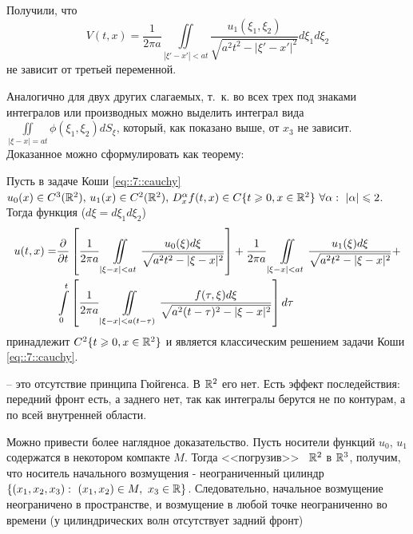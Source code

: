 \documentclass[../main.tex]{subfiles}
\begin{document}
Получили, что 
\[
V(t, x)=\frac{1}{2\pi a}\iint\limits_{|\xi' -x'|<at}\frac{u_1(\xi_1, \xi_2)}{\sqrt{a^2t^2-|\xi' -x'|^2}}d\xi_1d\xi_2
\]
не зависит от третьей переменной. 

Аналогично для двух других слагаемых, т.~к. во всех трех под знаками интегралов или производных можно выделить интеграл вида $\displaystyle\iint\limits_{|\xi -x|=at}\phi (\xi_1, \xi_2)dS_{\xi}$, который, как показано выше, от $x_3$ не зависит. Доказанное можно сформулировать как теорему:
\begin{theorem}
Пусть в задаче Коши \eqref{eq::7::cauchy} $u_0(x)\in C^3(\mathbb{R}^2),\, u_1(x)\in C^2(\mathbb{R}^2),\, D_x^{\alpha}f(t,x)\in C\{t\geqslant 0, x\in\mathbb{R}^2\}\ \forall\alpha :\ |\alpha |\leqslant 2$. Тогда функция ($d\xi =d\xi_1d\xi_2$)
\[
\begin{split}
u(t, x)=&\frac{\partial }{\partial t}\left[\frac{1}{2\pi a}\iint\limits_{|\xi - x|<at}\frac{u_0(\xi )d\xi}{\sqrt{a^2t^2-|\xi - x|^2}} \right]+ \frac{1}{2\pi a}\iint\limits_{|\xi - x|<at}\frac{u_1(\xi )d\xi}{\sqrt{a^2t^2-|\xi - x|^2}}+\\
&\int\limits_0^t\left[\frac{1}{2\pi a}\iint\limits_{|\xi - x|<a(t-\tau )}\frac{f(\tau ,\xi )d\xi}{\sqrt{a^2(t-\tau )^2-|\xi - x|^2}} \right]d\tau
\end{split}
\]
принадлежит $C^2\{t\geqslant 0, x\in\mathbb{R}^2 \}$ и является классическим решением задачи Коши \eqref{eq::7::cauchy}.
\end{theorem}
\begin{definition}
-- это отсутствие принципа Гюйгенса. В $\mathbb{R}^2$ его нет. Есть эффект последействия: передний фронт есть, а заднего нет, так как интегралы берутся не по контурам, а по всей внутренней области.
\end{definition}
Можно привести более наглядное доказательство. Пусть носители функций $u_0$, $u_1$ содержатся в некотором компакте $M$. Тогда <<погрузив>>~ $\mathbb{R}^2$ в $\mathbb{R}^3$, получим, что носитель начального возмущения - неограниченный цилиндр $\{(x_1, x_2, x_3): ~(x_1, x_2) \in M,~ x_3 \in \mathbb{R} \}$. Следовательно, начальное возмущение неограничено в пространстве, и возмущение в любой точке неограниченно во времени (у цилиндрических волн отсутствует задний фронт)
\end{document}
